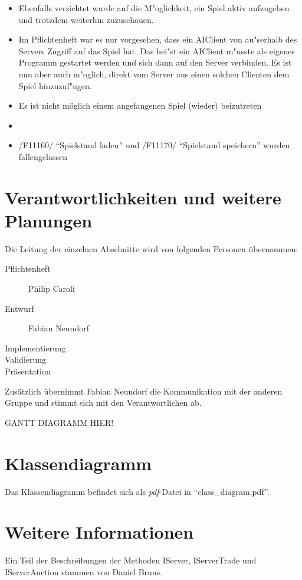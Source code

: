 \documentclass[a4paper,10pt]{article}
\begin{document}
\begin{itemize}
\item Ebenfalls verzichtet wurde auf die M"oglichkeit, ein Spiel aktiv aufzugeben und trotzdem weiterhin zuzuschauen.
\item Im Pflichtenheft war es nur vorgesehen, dass ein AIClient von au"serhalb des Servers Zugriff auf das Spiel hat. Das hei"st ein AIClient m"usste als eigenes Programm gestartet werden und sich dann auf den Server verbinden. Es ist nun aber auch m"oglich, direkt vom Server aus einen solchen Clienten dem Spiel hinzuzuf"ugen.
\item Es ist nicht möglich einem angefangenen Spiel (wieder) beizutreten
\item 
\item /F11160/ "`Spielstand laden"' und /F11170/ "`Spielstand speichern"' wurden fallengelassen 
\end{itemize}
\section{Verantwortlichkeiten und weitere Planungen}
Die Leitung der einzelnen Abschnitte wird von folgenden Personen übernommen:
\begin{description}
\item[Pflichtenheft] Philip Caroli
\item[Entwurf] Fabian Neundorf
\item[Implementierung]
\item[Validierung]
\item[Präsentation]
\end{description}
Zusätzlich übernimmt Fabian Neundorf die Kommunikation mit der anderen Gruppe und stimmt sich mit den Verantwortlichen ab.

GANTT DIAGRAMM HIER!
\section{Klassendiagramm}
Das Klassendiagramm befindet sich als \textit{pdf}-Datei in "`class\_diagram.pdf"'.
\section{Weitere Informationen}
Ein Teil der Beschreibungen der Methoden IServer, IServerTrade und IServerAuction stammen von Daniel Bruns.
\end{document}
